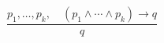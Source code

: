 \documentclass[preview,border=4pt]{standalone}
\begin{document}
\[
\frac{p_1,\ldots,p_k,\quad (p_1 \land \cdots \land p_k) \rightarrow q}{q}
\]
\end{document}
